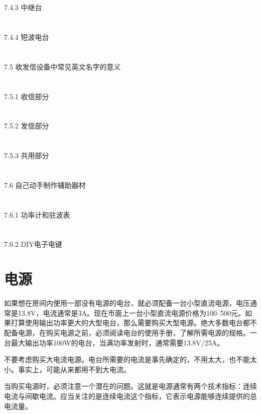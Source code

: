 \documentclass[12pt,UTF8]{ctexbook}
\begin{document}
\section{}7.4.3 中继台
\section{}7.4.4 短波电台
\section{}7.5 收发信设备中常见英文名字的意义
\section{}7.5.1 收信部分
\section{}7.5.2 发信部分
\section{}7.5.3 共用部分
\section{}7.6 自己动手制作辅助器材
\section{}7.6.1 功率计和驻波表
\section{}7.6.2 DIY电子电键

\section{电源}

如果想在房间内使用一部没有电源的电台，就必须配备一台小型直流电源，电压通常是13.8V，电流通常是3A。现在市面上一台小型直流电源价格为100--500元。如果打算使用输出功率更大的大型电台，那么需要购买大型电源。绝大多数电台都不配备电源，在购买电源之前，必须阅读电台的使用手册，了解所需电源的规格。一台最大输出功率100W的电台，当满功率发射时，通常需要13.8V/25A。

不要考虑购买大电流电源。电台所需要的电流是事先确定的，不用太大，也不能太小。事实上，可能从来都用不到大电流。

当购买电源时，必须注意一个潜在的问题。这就是电源通常有两个技术指标：连续电流与间歇电流。应当关注的是连续电流这个指标，它表示电源能够连续提供的总电流量。
\end{document}
